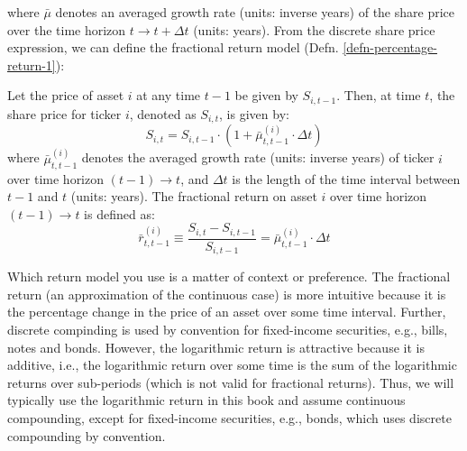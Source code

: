 \documentclass[11pt]{article}
\theoremstyle{definition}
\begin{document}
where $\bar{\mu}$ denotes an averaged growth rate (units: inverse years) of the share price over the time horizon $t\rightarrow{t+\Delta{t}}$ (units: years).
From the discrete share price expression, we can define the fractional return model (Defn. \ref{defn-percentage-return-1}):
\begin{definition}\label{defn-percentage-return-1}
Let the price of asset $i$ at any time $t-1$ be given by $S_{i,t-1}$. Then, at time $t$, the share price for ticker $i$, denoted as $S_{i,t}$, is given by:
\begin{equation}
    S_{i,t} = S_{i,t-1}\cdot\left(1+\bar{\mu}^{(i)}_{t,t-1}\cdot{\Delta{t}}\right)
\end{equation}
where $\bar{\mu}^{(i)}_{t,t-1}$ denotes the averaged growth rate (units: inverse years) of ticker $i$ over time horizon $(t-1)\rightarrow{t}$, 
and $\Delta{t}$ is the length of the time interval between $t-1$ and $t$ (units: years). The fractional return 
on asset $i$ over time horizon $(t-1)\rightarrow{t}$ is defined as: 
\begin{equation}
\bar{r}^{(i)}_{t,t-1} \equiv \frac{S_{i,t} - S_{i,t-1}}{S_{i,t-1}} = \bar{\mu}^{(i)}_{t,t-1}\cdot{\Delta{t}}
\end{equation}
\end{definition}
Which return model you use is a matter of context or preference. 
The fractional return (an approximation of the continuous case) is more intuitive because it is the percentage change in the price of an asset over some time interval.
Further, discrete compinding is used by convention for fixed-income securities, e.g., bills, notes and bonds.
However, the logarithmic return is attractive because it is additive, i.e., the logarithmic return over some time is the sum of the logarithmic returns over sub-periods
(which is not valid for fractional returns). 
Thus, we will typically use the logarithmic return in this book and assume continuous compounding, except for fixed-income securities, e.g., bonds, 
which uses discrete compounding by convention.
\end{document}
